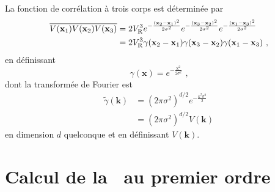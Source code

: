 La fonction de corrélation à trois corps est déterminée par
\begin{align}
\overline{V(\mathbf{x}_{\mathrm{1}})V(\mathbf{x}_{\mathrm{2}})V(\mathbf{x}_{\mathrm{3}})}&= 2V_{\mathrm{R}}^3 e^{-\frac{(\mathbf{x}_{\mathrm{2}}-\mathbf{x}_{\mathrm{1}})^2}{2\sigma^2}}e^{-\frac{(\mathbf{x}_{\mathrm{3}}-\mathbf{x}_{\mathrm{2}})^2}{2\sigma^2}}e^{-\frac{(\mathbf{x}_{\mathrm{1}}-\mathbf{x}_{\mathrm{3}})^2}{2\sigma^2}} \\ 
&=2V_{\mathrm{R}}^3 \gamma(\mathbf{x}_{\mathrm{2}}-\mathbf{x}_{\mathrm{1}})\gamma(\mathbf{x}_{\mathrm{3}}-\mathbf{x}_{\mathrm{2}})\gamma(\mathbf{x}_{\mathrm{1}}-\mathbf{x}_{\mathrm{3}}) \text{ ,}
\end{align}
en définissant 
\begin{equation}
\gamma(\mathbf{x})=e^{-\frac{\mathrm{x}^2}{2\sigma^2}} \text{ ,}
\end{equation}
dont la transformée de Fourier est
\begin{align}
\tilde{\gamma}(\mathbf{k}) &= (2\pi \sigma^2)^{d/2} e^{-\frac{k^2\sigma^2}{2}} \\
&= (2\pi \sigma^2)^{d/2} V(\mathbf{k})
\end{align}
en dimension $d$ quelconque et en définissant $V(\mathbf{k})$.

\section{Calcul de la \selfenergy\ au premier ordre}

